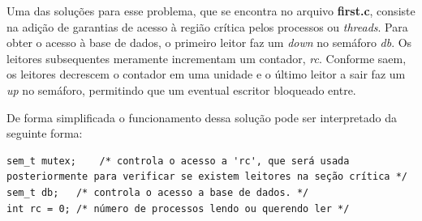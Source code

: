 	
	Uma das soluções para esse problema, que se encontra no arquivo \textbf{first.c}, consiste na adição de garantias de acesso à região crítica pelos processos ou \textit{threads}. Para obter o acesso à base de dados, o primeiro leitor faz um \textit{down} no semáforo \textit{db}. Os leitores subsequentes meramente incrementam um contador, \textit{rc}. Conforme saem, os leitores decrescem o contador em uma unidade e o último leitor a sair faz um \textit{up} no semáforo, permitindo que um eventual escritor bloqueado entre.
	
	De forma simplificada o funcionamento dessa solução pode ser interpretado da seguinte forma:
	\begin{lstlisting}[style=C]
sem_t mutex;	/* controla o acesso a 'rc', que será usada posteriormente para verificar se existem leitores na seção crítica */
sem_t db;	/* controla o acesso a base de dados. */
int rc = 0;	/* número de processos lendo ou querendo ler */
	\end{lstlisting}
	

